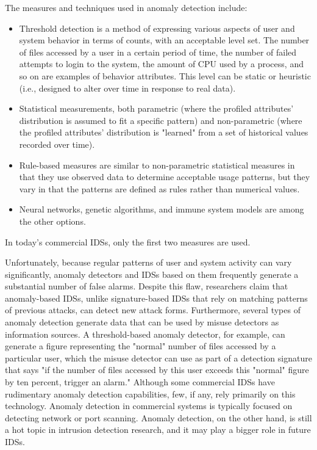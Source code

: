 \documentclass[12pt]{article}
\begin{document}
\begin{enumerate}
        \par The measures and techniques used in anomaly detection include:
        \begin{itemize}
            \item Threshold detection is a method of expressing various aspects of user and system behavior in terms of counts, with an acceptable level set. The number of files accessed by a user in a certain period of time, the number of failed attempts to login to the system, the amount of CPU used by a process, and so on are examples of behavior attributes. This level can be static or heuristic (i.e., designed to alter over time in response to real data).
            \item Statistical measurements, both parametric (where the profiled attributes' distribution is assumed to fit a specific pattern) and non-parametric (where the profiled attributes' distribution is "learned" from a set of historical values recorded over time).
            \item Rule-based measures are similar to non-parametric statistical measures in that they use observed data to determine acceptable usage patterns, but they vary in that the patterns are defined as rules rather than numerical values.
            \item Neural networks, genetic algorithms, and immune system models are among the other options.
            
        \end{itemize}
    
        \par In today's commercial IDSs, only the first two measures are used.
        \par Unfortunately, because regular patterns of user and system activity can vary significantly, anomaly detectors and IDSs based on them frequently generate a substantial number of false alarms. Despite this flaw, researchers claim that anomaly-based IDSs, unlike signature-based IDSs that rely on matching patterns of previous attacks, can detect new attack forms. Furthermore, several types of anomaly detection generate data that can be used by misuse detectors as information sources. A threshold-based anomaly detector, for example, can generate a figure representing the "normal" number of files accessed by a particular user, which the misuse detector can use as part of a detection signature that says "if the number of files accessed by this user exceeds this "normal" figure by ten percent, trigger an alarm." Although some commercial IDSs have rudimentary anomaly detection capabilities, few, if any, rely primarily on this technology. Anomaly detection in commercial systems is typically focused on detecting network or port scanning. Anomaly detection, on the other hand, is still a hot topic in intrusion detection research, and it may play a bigger role in future IDSs.
        

\end{enumerate}
\end{document}
